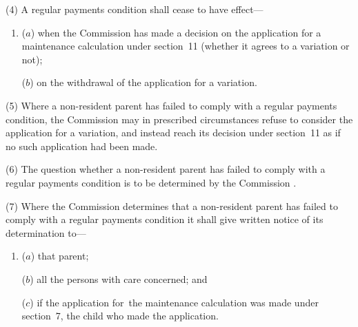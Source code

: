\documentclass[12pt,a4paper]{article}
\begin{document}
(4) A regular payments condition shall cease to have effect—
\begin{enumerate}\item[]
($a$) when the 
Commission  %
has made a decision on the application for a maintenance calculation under section~11 (whether 
it  %
agrees to a variation or not);

($b$) on the withdrawal of the application for a variation.
\end{enumerate}

(5) Where a non-resident parent has failed to comply with a regular payments condition, the 
Commission  %
may in prescribed circumstances refuse to consider the application for a variation, and instead reach 
its  %
decision under section~11 as if no such application had been made.

(6) The question whether a non-resident parent has failed to comply with a regular payments condition is to be determined by the 
Commission%
.

(7) Where the 
Commission  %
determines that a non-resident parent has failed to comply with a regular payments condition 
it  %
shall give written notice of 
its  %
determination to—
\begin{enumerate}\item[]
($a$) that parent;

($b$) all the persons with care concerned; and

($c$) if the application for~the maintenance calculation was made under section~7, the child who made the application.
\end{enumerate}


\end{document}
